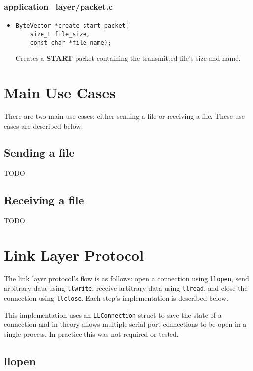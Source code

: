 \documentclass[11pt,a4paper,twocolumn]{article}
\begin{document}
\subsubsection{application\_layer/packet.c}

\begin{itemize}
    \item \begin{lstlisting}
ByteVector *create_start_packet(
    size_t file_size, 
    const char *file_name);
    \end{lstlisting}

          Creates a \textbf{START} packet containing the transmitted file's size and name.

\end{itemize}

\section{Main Use Cases}

There are two main use cases: either sending a file or receiving a file.
These use cases are described below.

\subsection{Sending a file}

TODO

\subsection{Receiving a file}

TODO

\section{Link Layer Protocol}

The link layer protocol's flow is as follows: open a connection using \lstinline{llopen}, send arbitrary data using \lstinline{llwrite}, receive arbitrary data using \lstinline{llread}, and close the connection using \lstinline{llclose}.
Each step's implementation is described below.

This implementation uses an \lstinline{LLConnection} struct to save the state of a connection and in theory allows multiple serial port connections to be open in a single process.
In practice this was not required or tested.

\subsection{llopen}
\end{document}
